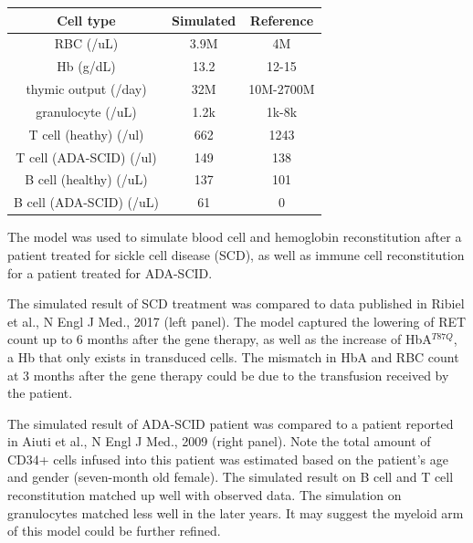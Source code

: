 \documentclass[a0paper,portrait]{baposter}
\begin{document}
\begin{poster}
{\begin{minipage}[ht]{0.4\linewidth}
\begin{center}
\fontsize{6.5pt}{6.5pt}\selectfont
\begin{tabular}{ c c c }
Cell type & Simulated & Reference \\ 
\hline
\scriptsize
RBC (/uL) & 3.9M & 4M \\  
Hb (g/dL) & 13.2 & 12-15  \\
thymic output (/day) & 32M & 10M-2700M \\  
granulocyte (/uL) & 1.2k & 1k-8k   \\ 
T cell (heathy) (/ul) & 662 & 1243   \\ 
T cell (ADA-SCID) (/ul) & 149 & 138  \\ 
B cell (healthy) (/uL) & 137 & 101 \\
B cell (ADA-SCID) (/uL) & 61 & 0  \\
\hline
\end{tabular}
\end{center}
\end{minipage}
\hspace{0.2cm}
\begin{minipage}[ht]{0.3\linewidth}
\end{minipage}


The model was used to simulate blood cell and hemoglobin reconstitution after a patient treated for sickle cell disease (SCD), as well as immune cell reconstitution for a patient treated for ADA-SCID. 

The simulated result of SCD treatment was compared to data published in Ribiel et al., N Engl J Med., 2017 (left panel). The model captured the lowering of RET count up to 6 months after the gene therapy, as well as the increase of HbA$^{T87Q}$, a Hb that only exists in transduced cells. The mismatch in HbA and RBC count at 3 months after the gene therapy could be due to the transfusion received by the patient. 


The simulated result of ADA-SCID patient was compared to a patient reported in Aiuti et al., N Engl J Med., 2009 (right panel). Note the total amount of CD34+ cells infused into this patient was estimated based on the patient's age and gender (seven-month old female). The simulated result on B cell and T cell reconstitution matched up well with observed data. The simulation on granulocytes matched less well in the later years. It may suggest the myeloid arm of this model could be further refined. 

}
\end{poster}
\end{document}
